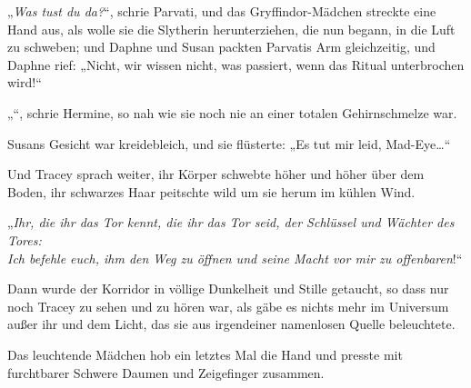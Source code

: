 „\emph{Was tust du da?}“, schrie Parvati, und das Gryffindor-Mädchen streckte eine Hand aus, als wolle sie die Slytherin herunterziehen, die nun begann, in die Luft zu schweben; und Daphne und Susan packten Parvatis Arm gleichzeitig, und Daphne rief: „Nicht, wir wissen nicht, was passiert, wenn das Ritual unterbrochen wird!“

„“, schrie Hermine, so nah wie sie noch nie an einer totalen Gehirnschmelze war.

Susans Gesicht war kreidebleich, und sie flüsterte: „Es tut mir leid, Mad-Eye…“

Und Tracey sprach weiter, ihr Körper schwebte höher und höher über dem Boden, ihr schwarzes Haar peitschte wild um sie herum im kühlen Wind.

„\emph{Ihr, die ihr das Tor kennt, die ihr das Tor seid, der Schlüssel und Wächter des Tores:\\
Ich befehle euch, ihm den Weg zu öffnen und seine Macht vor mir zu offenbaren}!“

Dann wurde der Korridor in völlige Dunkelheit und Stille getaucht, so dass nur noch Tracey zu sehen und zu hören war, als gäbe es nichts mehr im Universum außer ihr und dem Licht, das sie aus irgendeiner namenlosen Quelle beleuchtete.

Das leuchtende Mädchen hob ein letztes Mal die Hand und presste mit furchtbarer Schwere Daumen und Zeigefinger zusammen.

